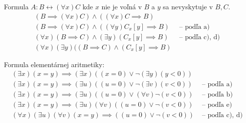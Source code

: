 \begin{priklad}
    \noindent
    Formula $A: B \leftrightarrow (\forall x) C$ kde $x$ nie je voľná
    v $B$ a $y$ sa nevyskytuje v $B,C$.
    \begin{align*}
       (B \implies (\forall x) C) \land ((\forall x) C \implies B) &\\
       (B \implies (\forall x) C) \land ((\forall y) C_x[y] \implies B) 
       & \mbox{ -- podľa a)} \\
       (\forall x)(B \implies C) \land (\exists y) (C_x[y] \implies B) 
       & \mbox{ -- podľa c), d)} \\
       (\forall x)(\exists y)((B \implies C) \land (C_x[y] \implies B)
    \end{align*}
\end{priklad}

\begin{priklad}
    Formula elementárnej aritmetiky:
    \begin{align*}
        (\exists x) (x=y) \implies (\exists x)((x=0) \lor
                    \neg (\exists y)(y<0))& \\
        (\exists x) (x=y) \implies (\exists u)((u=0) \lor
                    \neg (\exists v)(v<0)) &\mbox{ -- podľa a)}\\
        (\exists x) (x=y) \implies (\exists u)((u=0) \lor
                    (\forall  v) \neg(v<0)) &\mbox{ -- podľa b)}\\
        (\exists x) (x=y) \implies (\exists u)(\forall v)
                ((u=0) \lor \neg(v<0)) &\mbox{ -- podľa e)}\\
        (\forall x)(\exists u)(\forall v) (x=y) \implies 
                ((u=0) \lor \neg(v<0)) &\mbox{ -- podľa c), d)}
    \end{align*}
\end{priklad}

